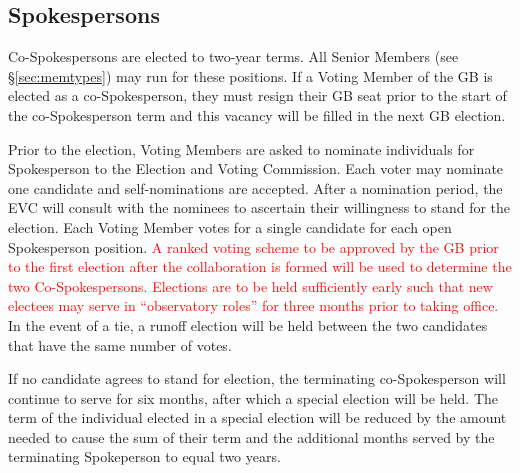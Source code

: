 \documentclass[12pt]{article}
\begin{document}
\subsection{Spokespersons}

Co-Spokespersons are elected to two-year terms. All Senior Members (see \S\ref{sec:memtypes}) may  run for these positions.  %
If a Voting Member of the GB is elected as a co-Spokesperson, they must resign their GB seat prior to the start of the co-Spokesperson term and this vacancy will be filled in the next GB election. 

Prior to the election, Voting Members are asked to nominate individuals for Spokesperson to the Election and Voting Commission. Each voter may nominate one candidate and self-nominations are accepted. %
After a nomination period, the EVC will consult with the nominees to ascertain their willingness to stand for the election.
Each Voting Member votes for a single candidate for each open Spokesperson position. \textcolor{red}{A ranked voting scheme to be approved by the GB prior to the first election after the collaboration is formed will be used to determine the two Co-Spokespersons. Elections are to be held sufficiently early such that new electees may serve in ``observatory roles'' for three months prior to taking office.}
In the event of a tie, a runoff election will be held between the two candidates that have the same number of votes. 


If no candidate agrees to stand for election, the terminating co-Spokesperson will continue to serve for six months, after which a special election will be held. The term of the individual elected in a special election will be reduced by the amount needed to cause the sum of their term and the additional months served by the terminating Spokeperson to equal two years.


\end{document}
